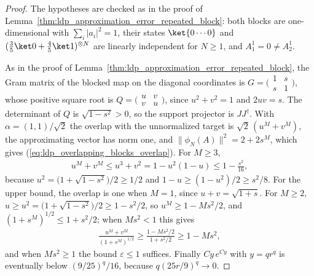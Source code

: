 \begin{proof}
    \leanok
    The hypotheses are checked as in the proof of
    Lemma~\ref{thm:ldp_approximation_error_repeated_block}: both blocks are
    one-dimensional with $\sum_i\lvert a_i\rvert^2=1$, their states
    $\ket{0\cdots0}$ and $(\tfrac35\ket0+\tfrac45\ket1)^{\otimes N}$ are
    linearly independent for $N\geq1$, and $A_1^1=0\neq A_2^1$.

    As in the proof of Lemma~\ref{thm:ldp_approximation_error_repeated_block},
    the Gram matrix of the blocked map on the diagonal coordinates is
    $G=\bigl(\begin{smallmatrix}1&s\\s&1\end{smallmatrix}\bigr)$, whose positive
    square root is $Q=\bigl(\begin{smallmatrix}u&v\\v&u\end{smallmatrix}\bigr)$,
    since $u^2+v^2=1$ and $2uv=s$. The determinant of $Q$ is $\sqrt{1-s^2}>0$, so
    the support projector is $JJ^\dagger$. With $\alpha=(1,1)/\sqrt2$ the overlap
    with the unnormalized target is $\sqrt2\,(u^M+v^M)$, the approximating vector
    has norm one, and $\lVert\phi_N(A)\rVert^2=2+2s^M$, which gives
    (\ref{eq:ldp_overlapping_blocks_overlap}). For $M\geq3$,
    \begin{align*}
        u^M+v^M\leq u^3+v^2=1-u^2(1-u)\leq1-\frac{s^2}{16},
    \end{align*}
    because $u^2=\bigl(1+\sqrt{1-s^2}\bigr)/2\geq1/2$ and
    $1-u\geq(1-u^2)/2\geq s^2/8$. For the upper bound, the overlap is one when
    $M=1$, since $u+v=\sqrt{1+s}$. For $M\geq2$,
    $u\geq u^2=\bigl(1+\sqrt{1-s^2}\bigr)/2\geq1-s^2/2$, so $u^M\geq1-Ms^2/2$, and
    $(1+s^M)^{1/2}\leq1+s^2/2$; when $Ms^2<1$ this gives
    \begin{align*}
        \frac{u^M+v^M}{(1+s^M)^{1/2}}\geq\frac{1-Ms^2/2}{1+s^2/2}\geq1-Ms^2,
    \end{align*}
    and when $Ms^2\geq1$ the bound $\varepsilon\leq1$ suffices. Finally $Cy\,e^{Cy}$
    with $y=qr^q$ is eventually below $(9/25)^q/16$, because $q(25r/9)^q\to0$.
\end{proof}

